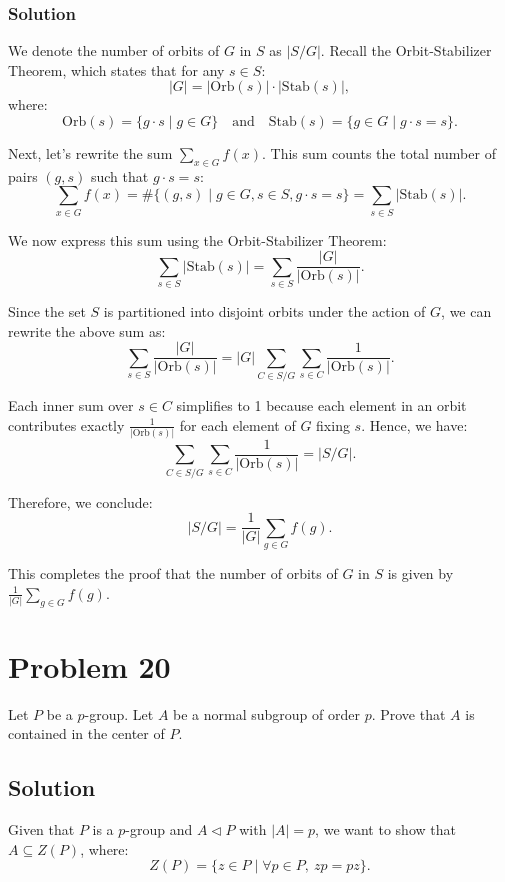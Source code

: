 \documentclass[12pt]{article}
\begin{document}
\subsubsection*{Solution}
We denote the number of orbits of \( G \) in \( S \) as \( |S / G| \). Recall the Orbit-Stabilizer Theorem, which states that for any \( s \in S \):
\[
|G| = |\text{Orb}(s)| \cdot |\text{Stab}(s)|,
\]
where:
\[
\text{Orb}(s) = \{g \cdot s \mid g \in G\} \quad \text{and} \quad \text{Stab}(s) = \{g \in G \mid g \cdot s = s\}.
\]

Next, let's rewrite the sum \( \sum_{x \in G} f(x) \). This sum counts the total number of pairs \((g, s)\) such that \( g \cdot s = s \):
\[
\sum_{x \in G} f(x) = \# \{(g, s) \mid g \in G, s \in S, g \cdot s = s\} = \sum_{s \in S} |\text{Stab}(s)|.
\]

We now express this sum using the Orbit-Stabilizer Theorem:
\[
\sum_{s \in S} |\text{Stab}(s)| = \sum_{s \in S} \frac{|G|}{|\text{Orb}(s)|}.
\]

Since the set \( S \) is partitioned into disjoint orbits under the action of \( G \), we can rewrite the above sum as:
\[
\sum_{s \in S} \frac{|G|}{|\text{Orb}(s)|} = |G| \sum_{C \in S / G} \sum_{s \in C} \frac{1}{|\text{Orb}(s)|}.
\]

Each inner sum over \( s \in C \) simplifies to 1 because each element in an orbit contributes exactly \(\frac{1}{|\text{Orb}(s)|}\) for each element of \( G \) fixing \( s \). Hence, we have:
\[
\sum_{C \in S / G} \sum_{s \in C} \frac{1}{|\text{Orb}(s)|} = |S / G|.
\]

Therefore, we conclude:
\[
|S / G| = \frac{1}{|G|} \sum_{g \in G} f(g).
\]

This completes the proof that the number of orbits of \( G \) in \( S \) is given by \( \frac{1}{|G|} \sum_{g \in G} f(g) \).


\section*{Problem 20}
Let \( P \) be a \( p \)-group. Let \( A \) be a normal subgroup of order \( p \). Prove that \( A \) is contained in the center of \( P \).

\subsection*{Solution}
Given that \( P \) is a \( p \)-group and \( A \triangleleft P \) with \( |A| = p \), we want to show that \( A \subseteq Z(P) \), where:
\[
Z(P) = \{z \in P \mid \forall p \in P, \ zp = pz \}.
\]
\end{document}
